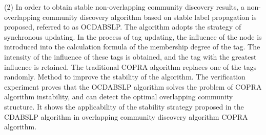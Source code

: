 \begin{englishabstract}
(2) In order to obtain stable non-overlapping community discovery results, a non-overlapping community discovery algorithm based on stable label propagation is proposed, referred to as OCDABSLP. The algorithm adopts the strategy of synchronous updating. In the process of tag updating, the influence of the node is introduced into the calculation formula of the membership degree of the tag. The intensity of the influence of these tags is obtained, and the tag with the greatest influence is retained. The traditional COPRA algorithm replaces one of the tags randomly. Method to improve the stability of the algorithm. The verification experiment proves that the OCDABSLP algorithm solves the problem of COPRA algorithm instability, and can detect the optimal overlapping community structure. It shows the applicability of the stability strategy proposed in the CDABSLP algorithm in overlapping community discovery algorithm COPRA algorithm.
   

\end{englishabstract}

